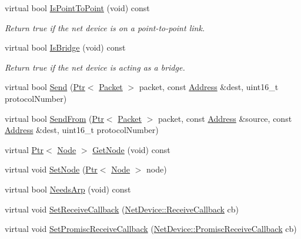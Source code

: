 \begin{DoxyCompactItemize}
virtual bool \hyperlink{classns3_1_1OpenFlowSwitchNetDevice_a467062edd9bb5b1f0c7a766596003c62}{Is\+Point\+To\+Point} (void) const 
\begin{DoxyCompactList}\small\item\em Return true if the net device is on a point-\/to-\/point link. \end{DoxyCompactList}\item 
virtual bool \hyperlink{classns3_1_1OpenFlowSwitchNetDevice_a4428541239b21fd0ecf7e589d7f4790e}{Is\+Bridge} (void) const 
\begin{DoxyCompactList}\small\item\em Return true if the net device is acting as a bridge. \end{DoxyCompactList}\item 
virtual bool \hyperlink{classns3_1_1OpenFlowSwitchNetDevice_ada683f14699af3f11ce3658f51269668}{Send} (\hyperlink{classns3_1_1Ptr}{Ptr}$<$ \hyperlink{classns3_1_1Packet}{Packet} $>$ packet, const \hyperlink{classns3_1_1Address}{Address} \&dest, uint16\+\_\+t protocol\+Number)
\item 
virtual bool \hyperlink{classns3_1_1OpenFlowSwitchNetDevice_ad696726590d7076bdc25969146a980cd}{Send\+From} (\hyperlink{classns3_1_1Ptr}{Ptr}$<$ \hyperlink{classns3_1_1Packet}{Packet} $>$ packet, const \hyperlink{classns3_1_1Address}{Address} \&source, const \hyperlink{classns3_1_1Address}{Address} \&dest, uint16\+\_\+t protocol\+Number)
\item 
virtual \hyperlink{classns3_1_1Ptr}{Ptr}$<$ \hyperlink{classns3_1_1Node}{Node} $>$ \hyperlink{classns3_1_1OpenFlowSwitchNetDevice_a5d75e13faa3c9372a9327afa26fc033b}{Get\+Node} (void) const 
\item 
virtual void \hyperlink{classns3_1_1OpenFlowSwitchNetDevice_a620ee1fbb3418d31d780c8f3b4ed1c48}{Set\+Node} (\hyperlink{classns3_1_1Ptr}{Ptr}$<$ \hyperlink{classns3_1_1Node}{Node} $>$ node)
\item 
virtual bool \hyperlink{classns3_1_1OpenFlowSwitchNetDevice_a6dd45426f632383955f5fa0dfec1a236}{Needs\+Arp} (void) const 
\item 
virtual void \hyperlink{classns3_1_1OpenFlowSwitchNetDevice_a16cb2bab4a182be8edc3654423df3a4a}{Set\+Receive\+Callback} (\hyperlink{classns3_1_1NetDevice_ad5e5e1ca187472bc2ba99575d8def568}{Net\+Device\+::\+Receive\+Callback} cb)
\item 
virtual void \hyperlink{classns3_1_1OpenFlowSwitchNetDevice_aa478c75ffe8f6e20bc50187aa7c584cd}{Set\+Promisc\+Receive\+Callback} (\hyperlink{classns3_1_1NetDevice_a427225795919f26c414bee2ea3f31ed2}{Net\+Device\+::\+Promisc\+Receive\+Callback} cb)

\end{DoxyCompactItemize}
